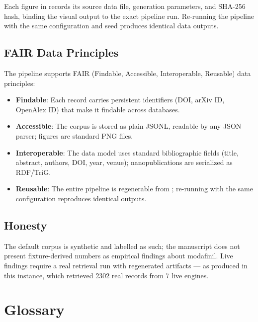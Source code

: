 \documentclass[
  english,
]{article}
\providecommand{\tightlist}{%
  \setlength{\itemsep}{0pt}\setlength{\parskip}{0pt}}
\begin{document}
Each figure in  records its source data
file, generation parameters, and SHA-256 hash, binding the visual output
to the exact pipeline run. Re-running the pipeline with the same
configuration and seed produces identical data outputs.

\subsection{FAIR Data Principles}\label{fair-data-principles}

The pipeline supports FAIR (Findable, Accessible, Interoperable,
Reusable) data principles:

\begin{itemize}
\tightlist
\item
  \textbf{Findable}: Each record carries persistent identifiers (DOI,
  arXiv ID, OpenAlex ID) that make it findable across databases.
\item
  \textbf{Accessible}: The corpus is stored as plain JSONL, readable by
  any JSON parser; figures are standard PNG files.
\item
  \textbf{Interoperable}: The data model uses standard bibliographic
  fields (title, abstract, authors, DOI, year, venue); nanopublications
  are serialized as RDF/TriG.
\item
  \textbf{Reusable}: The entire pipeline is regenerable from
  ; re-running with the same
  configuration reproduces identical outputs.
\end{itemize}

\subsection{Honesty}\label{honesty}

The default corpus is synthetic and labelled as such; the manuscript
does not present fixture-derived numbers as empirical findings about
modafinil. Live findings require a real retrieval run with regenerated
artifacts --- as produced in this instance, which retrieved 2302 real
records from 7 live engines.

\newpage

\section{Glossary}\label{glossary}
\end{document}
